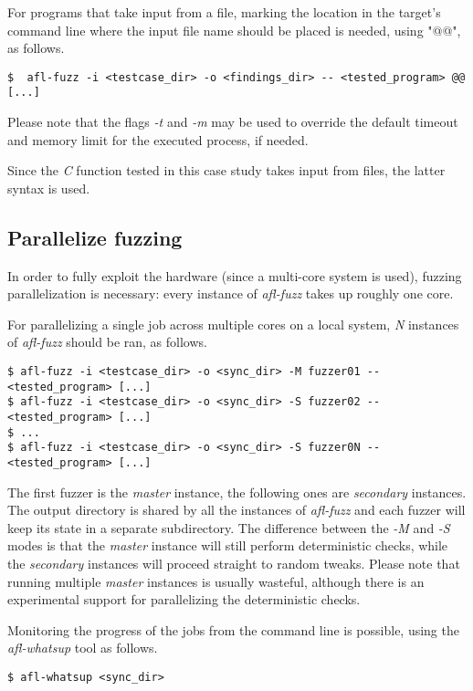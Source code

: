 For programs that take input from a file, marking the location in the target's command line where the input file name should be placed is needed, using "@@", as follows\parencite{AFL_guide}\parencite{AFL_readme}.
\begin{lstlisting}
$  afl-fuzz -i <testcase_dir> -o <findings_dir> -- <tested_program> @@ [...]
\end{lstlisting}
Please note that the flags \textit{-t} and \textit{-m} may be used to override the default timeout and memory limit for the executed process, if needed.

Since the \textit{C} function tested in this case study takes input from files, the latter syntax is used.

\subsection{Parallelize fuzzing}
In order to fully exploit the hardware (since a multi-core system is used), fuzzing parallelization is necessary: every instance of \textit{afl-fuzz} takes up roughly one core\parencite{AFL_readme}.

For parallelizing a single job across multiple cores on a local system, \textit{N} instances of \textit{afl-fuzz} should be ran, as follows\parencite{AFL_par}.
\begin{lstlisting}
$ afl-fuzz -i <testcase_dir> -o <sync_dir> -M fuzzer01 -- <tested_program> [...]
$ afl-fuzz -i <testcase_dir> -o <sync_dir> -S fuzzer02 -- <tested_program> [...]
$ ...
$ afl-fuzz -i <testcase_dir> -o <sync_dir> -S fuzzer0N -- <tested_program> [...]
\end{lstlisting}
The first fuzzer is the \textit{master} instance, the following ones are \textit{secondary} instances.
The output directory is shared by all the instances of \textit{afl-fuzz} and each fuzzer will keep its state in a separate subdirectory.
The difference between the \textit{-M} and \textit{-S} modes is that the \textit{master} instance will still perform deterministic checks, while the \textit{secondary} instances will proceed straight to random tweaks.
Please note that running multiple \textit{master} instances is usually wasteful, although there is an
experimental support for parallelizing the deterministic checks.

Monitoring the progress of the jobs from the command line is possible, using the \textit{afl-whatsup} tool as follows\parencite{AFL_par}. 
\begin{lstlisting}
$ afl-whatsup <sync_dir>
\end{lstlisting}

